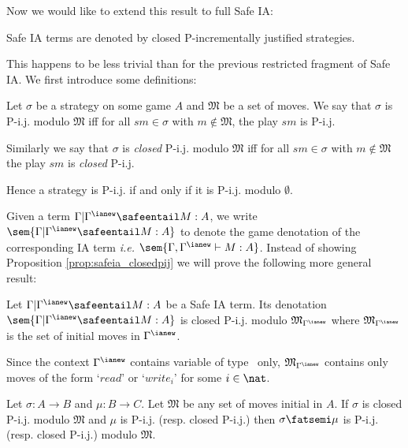 Now we would like to extend this result to full Safe IA:
\begin{proposition}
\label{prop:safeia_closedpij} Safe IA terms are denoted by closed
P-incrementally justified strategies.
\end{proposition}

This happens to be less trivial than for the previous restricted fragment of Safe IA. We first introduce some definitions:

\begin{definition}
\label{def:pij_modulo} Let $\sigma$ be a strategy on some game $A$
and $\mathfrak{M}$ be a set of moves. We say that $\sigma$ is P-i.j.
modulo $\mathfrak{M}$ iff for all $s m \in \sigma$ with $m \not\in
\mathfrak{M}$, the play $s m$ is P-i.j.

Similarly we say that $\sigma$ is \emph{closed} P-i.j. modulo
$\mathfrak{M}$ iff for all $s m \in \sigma$ with $m \not\in
\mathfrak{M}$ the play $s m$ is \emph{closed} P-i.j.

Hence a strategy is P-i.j. if and only if it is P-i.j. modulo
$\emptyset$.
\end{definition}

Given a term $\Gamma | \Gamma^{\ianew} \safeentail M : A$, we write
$\sem{\Gamma | \Gamma^{\ianew} \safeentail M : A}$ to denote the
game denotation of the corresponding IA term {\it i.e.}
$\sem{\Gamma, \Gamma^{\ianew} \vdash M : A}$. Instead of showing
Proposition \ref{prop:safeia_closedpij} we will prove the following
more general result:
\begin{proposition}
\label{prop:safeia_closedpijmodulo} Let $\Gamma | \Gamma^{\ianew}
\safeentail M : A $ be a Safe IA term. Its denotation $\sem{\Gamma |
\Gamma^{\ianew} \safeentail M : A}$ is closed P-i.j. modulo
$\mathfrak{M}_{\Gamma^{\ianew}}$ where
$\mathfrak{M}_{\Gamma^{\ianew}}$ is the set of initial moves in
$\Gamma^{\ianew}$.
\end{proposition}

\begin{remark}
Since the context $\Gamma^{\ianew}$ contains variable of type
\iavar\ only, $\mathfrak{M}_{\Gamma^{\ianew}}$ contains only moves
of the form `$read$' or `$write_i$' for some $i\in \nat$.
\end{remark}

\begin{lemma}
\label{lem:leftcompos_preserv_pijmodulo}
 Let $\sigma : A \rightarrow
B$ and $\mu : B \rightarrow C$.
  Let $\mathfrak{M}$ be any set of moves initial in $A$.
  If $\sigma$ is closed  P-i.j. modulo $\mathfrak{M}$ and $\mu$ is
  P-i.j. (resp. closed P-i.j.) then $\sigma \fatsemi \mu$ is P-i.j. (resp. closed P-i.j.) modulo $\mathfrak{M}$.
\end{lemma}


